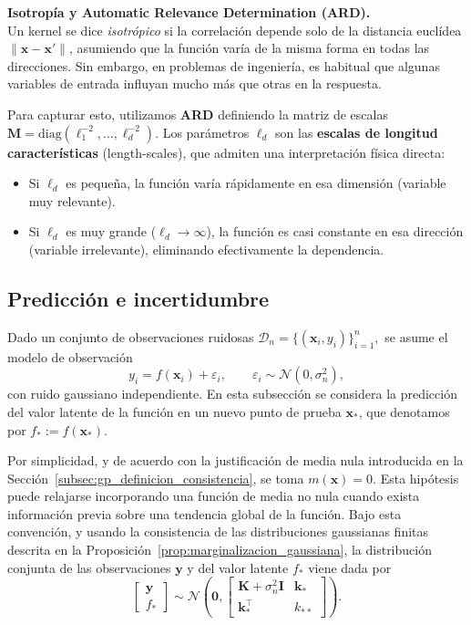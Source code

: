 \noindent\textbf{Isotropía y Automatic Relevance Determination (ARD).} \\
Un kernel se dice \emph{isotrópico} si la correlación depende solo de la distancia euclídea $\|\bm{x}-\bm{x}'\|$, asumiendo que la función varía de la misma forma en todas las direcciones. Sin embargo, en problemas de ingeniería, es habitual que algunas variables de entrada influyan mucho más que otras en la respuesta.

Para capturar esto, utilizamos \textbf{ARD} definiendo la matriz de escalas $\bm{M} = \mathrm{diag}(\ell_1^{-2}, \dots, \ell_d^{-2})$. Los parámetros $\ell_d$ son las \textbf{escalas de longitud características} (length-scales), que admiten una interpretación física directa:
\begin{itemize}
    \item Si $\ell_d$ es pequeña, la función varía rápidamente en esa dimensión (variable muy relevante).
    \item Si $\ell_d$ es muy grande ($\ell_d \to \infty$), la función es casi constante en esa dirección (variable irrelevante), eliminando efectivamente la dependencia.
\end{itemize}

\subsection{Predicción e incertidumbre}
\label{subsec:gp_prediccion}

Dado un conjunto de observaciones ruidosas
\(
\mathcal{D}_n=\{(\bm{x}_i,y_i)\}_{i=1}^n,
\)
se asume el modelo de observación
\[
y_i=f(\bm{x}_i)+\varepsilon_i,
\qquad
\varepsilon_i\sim\mathcal{N}(0,\sigma_n^2),
\]
con ruido gaussiano independiente. En esta subsección se considera la predicción del valor
latente de la función en un nuevo punto de prueba \(\bm{x}_*\), que denotamos por
\(
f_* := f(\bm{x}_*).
\)

Por simplicidad, y de acuerdo con la justificación de media nula introducida en la
Sección~\ref{subsec:gp_definicion_consistencia}, se toma \(m(\bm{x})=0\). Esta hipótesis
puede relajarse incorporando una función de media no nula cuando exista información
previa sobre una tendencia global de la función. Bajo esta convención, y usando la
consistencia de las distribuciones gaussianas finitas descrita en la
Proposición~\ref{prop:marginalizacion_gaussiana}, la distribución conjunta de las
observaciones \(\bm{y}\) y del valor latente \(f_*\) viene dada por
\begin{equation}
\begin{bmatrix}
\bm{y} \\
f_*
\end{bmatrix}
\sim
\mathcal{N}\left(
\bm{0},
\begin{bmatrix}
\bm{K}+\sigma_n^2\bm{I} & \bm{k}_* \\
\bm{k}_*^\top & k_{**}
\end{bmatrix}
\right).
\label{eq:gp_joint_predictive}
\end{equation}

